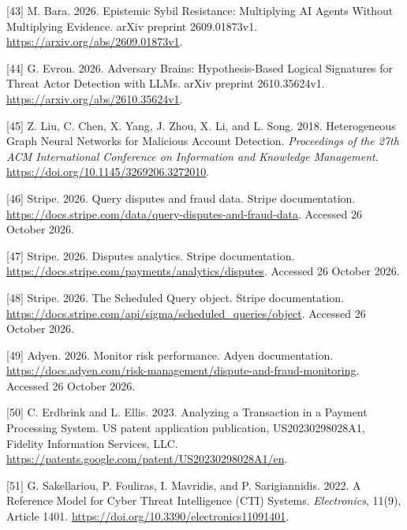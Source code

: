 \documentclass[
  11pt,
]{article}
\newlength{\cslhangindent}
\newlength{\cslentryspacingunit} %
\newenvironment{CSLReferences}[2] %
 {%
  \setlength{\parindent}{0pt}
  \ifodd #1
  \let\oldpar\par
  \def\par{\hangindent=\cslhangindent\oldpar}
  \fi
  \setlength{\parskip}{#2\cslentryspacingunit}
 }%
 {}
\begin{document}
\begin{CSLReferences}{1}{1}
\leavevmode{}%
{[}43{]} M. Bara. 2026. Epistemic Sybil Resistance: Multiplying AI
Agents Without Multiplying Evidence. arXiv preprint 2609.01873v1.
\url{https://arxiv.org/abs/2609.01873v1}.

\leavevmode{}%
{[}44{]} G. Evron. 2026. Adversary Brains: Hypothesis-Based Logical
Signatures for Threat Actor Detection with LLMs. arXiv preprint
2610.35624v1. \url{https://arxiv.org/abs/2610.35624v1}.

\leavevmode{}%
{[}45{]} Z. Liu, C. Chen, X. Yang, J. Zhou, X. Li, and L. Song. 2018.
Heterogeneous Graph Neural Networks for Malicious Account Detection.
\emph{Proceedings of the 27th ACM International Conference on
Information and Knowledge Management}.
\url{https://doi.org/10.1145/3269206.3272010}.

\leavevmode{}%
{[}46{]} Stripe. 2026. Query disputes and fraud data. Stripe
documentation.
\url{https://docs.stripe.com/data/query-disputes-and-fraud-data}.
Accessed 26 October 2026.

\leavevmode{}%
{[}47{]} Stripe. 2026. Disputes analytics. Stripe documentation.
\url{https://docs.stripe.com/payments/analytics/disputes}. Accessed 26
October 2026.

\leavevmode{}%
{[}48{]} Stripe. 2026. The Scheduled Query object. Stripe documentation.
\url{https://docs.stripe.com/api/sigma/scheduled_queries/object}.
Accessed 26 October 2026.

\leavevmode{}%
{[}49{]} Adyen. 2026. Monitor risk performance. Adyen documentation.
\url{https://docs.adyen.com/risk-management/dispute-and-fraud-monitoring}.
Accessed 26 October 2026.

\leavevmode{}%
{[}50{]} C. Erdbrink and L. Ellis. 2023. Analyzing a Transaction in a
Payment Processing System. US patent application publication,
US20230298028A1, Fidelity Information Services, LLC.
\url{https://patents.google.com/patent/US20230298028A1/en}.

\leavevmode{}%
{[}51{]} G. Sakellariou, P. Fouliras, I. Mavridis, and P. Sarigiannidis.
2022. A Reference Model for Cyber Threat Intelligence (CTI) Systems.
\emph{Electronics}, 11(9), Article 1401.
\url{https://doi.org/10.3390/electronics11091401}.


\end{CSLReferences}
\end{document}
